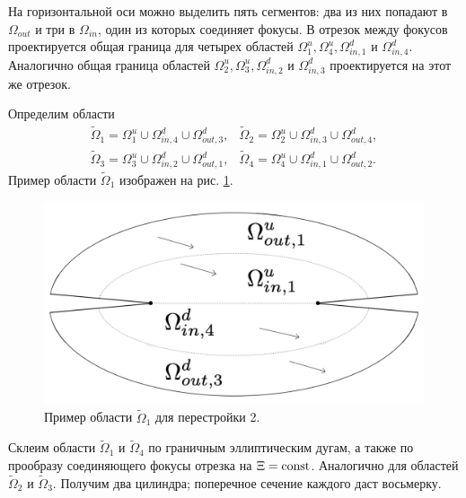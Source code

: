 На горизонтальной оси можно выделить пять сегментов: два из них попадают в $\Omega_{out}$ и три в $\Omega_{in}$, один из которых соединяет фокусы.
В отрезок между фокусов проектируется общая граница для четырех областей $\Omega_1^u, \Omega_4^u, \Omega_{in, 1}^d$ и $\Omega_{in, 4}^d$.
Аналогично общая граница областей $\Omega_2^u, \Omega_3^u, \Omega_{in, 2}^d$ и $\Omega_{in, 3}^d$ проектируется на этот же отрезок.

Определим области 
\begin{equation}
\begin{array}{cc}
\widetilde{\Omega}_1 = \Omega_1^u \cup \Omega_{in, 4}^d \cup \Omega_{out, 3}^d, &
\widetilde{\Omega}_2 = \Omega_2^u \cup \Omega_{in, 3}^d \cup \Omega_{out, 4}^d, \\
\widetilde{\Omega}_3 = \Omega_3^u \cup \Omega_{in, 2}^d \cup \Omega_{out, 1}^d, &
\widetilde{\Omega}_4 = \Omega_4^u \cup \Omega_{in, 1}^d \cup \Omega_{out, 2}^d. 
\end{array}
\label{eq:case2Omegas}
\end{equation}
Пример области $\widetilde{\Omega}_1$ изображен на рис. \ref{fig:pt9:_domain_atom_foc_ell}.
 \begin{figure}[!htb]
\centering
\includegraphics[scale=0.125]{images/section2/atoms/domain_atom_foc_ell.pdf}
    \caption{Пример области $\widetilde{\Omega}_1$ для перестройки 2.}
    \label{fig:pt9:_domain_atom_foc_ell}
\end{figure}
 
Склеим области $\widetilde{\Omega}_1$ и $\widetilde{\Omega}_4$ по граничным эллиптическим дугам, а также по прообразу соединяющего фокусы отрезка на $\Xi = \mathrm{const}$. Аналогично для областей $\widetilde{\Omega}_2$ и $\widetilde{\Omega}_3$. Получим два цилиндра; поперечное сечение каждого даст восьмерку. 

